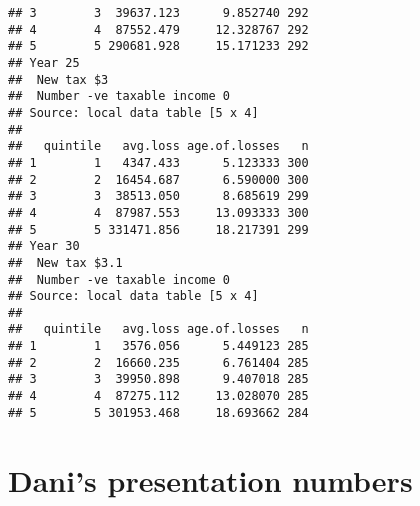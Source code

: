 \documentclass{grattan}\usepackage[]{graphicx}\usepackage[]{color}
\makeatletter
\newenvironment{kframe}{%
 \def\at@end@of@kframe{}%
 \ifinner\ifhmode%
  \def\at@end@of@kframe{\end{minipage}}%
  \begin{minipage}{\columnwidth}%
 \fi\fi%
 \def\FrameCommand##1{\hskip\@totalleftmargin \hskip-\fboxsep
 \colorbox{shadecolor}{##1}\hskip-\fboxsep
     \hskip-\linewidth \hskip-\@totalleftmargin \hskip\columnwidth}%
 \MakeFramed {\advance\hsize-\width
   \@totalleftmargin\z@ \linewidth\hsize
   \@setminipage}}%
 {\par\unskip\endMakeFramed%
 \at@end@of@kframe}
\newenvironment{knitrout}{}{} %
\makeatother
\begin{document}
\begin{knitrout}
\begin{kframe}
\begin{verbatim}
## 3        3  39637.123      9.852740 292
## 4        4  87552.479     12.328767 292
## 5        5 290681.928     15.171233 292
## Year 25 
##  New tax $3 
##  Number -ve taxable income 0 
## Source: local data table [5 x 4]
## 
##   quintile   avg.loss age.of.losses   n
## 1        1   4347.433      5.123333 300
## 2        2  16454.687      6.590000 300
## 3        3  38513.050      8.685619 299
## 4        4  87987.553     13.093333 300
## 5        5 331471.856     18.217391 299
## Year 30 
##  New tax $3.1 
##  Number -ve taxable income 0 
## Source: local data table [5 x 4]
## 
##   quintile   avg.loss age.of.losses   n
## 1        1   3576.056      5.449123 285
## 2        2  16660.235      6.761404 285
## 3        3  39950.898      9.407018 285
## 4        4  87275.112     13.028070 285
## 5        5 301953.468     18.693662 284
\end{verbatim}
\end{kframe}
\end{knitrout}


\chapter{Dani's presentation numbers}
\onecolumn
\end{document}
